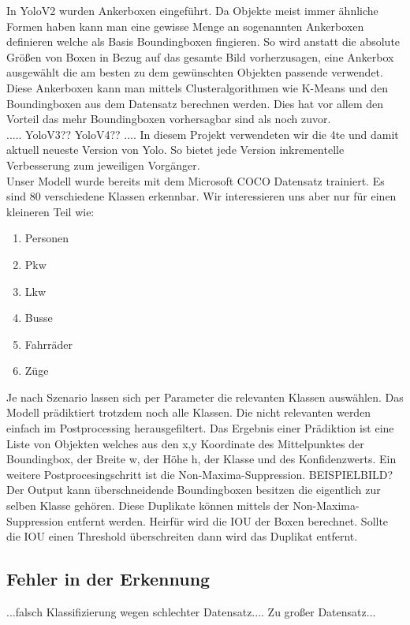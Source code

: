 \documentclass[conference]{IEEEtran}
\begin{document}
	In YoloV2 wurden Ankerboxen eingeführt. Da Objekte meist immer ähnliche Formen haben kann man eine gewisse Menge an sogenannten Ankerboxen definieren welche als Basis Boundingboxen fingieren. So wird anstatt die absolute Größen von Boxen in Bezug auf das gesamte Bild vorherzusagen, eine Ankerbox ausgewählt die am besten zu dem gewünschten Objekten passende verwendet. Diese Ankerboxen kann man mittels Clusteralgorithmen wie K-Means und den Boundingboxen aus dem Datensatz berechnen werden. Dies hat vor allem den Vorteil das mehr Boundingboxen vorhersagbar sind als noch zuvor. \cite{b3}\\
	.....
	YoloV3??
	YoloV4??
	....
	In diesem Projekt verwendeten wir die 4te und damit aktuell neueste Version von Yolo\cite{b2}. So bietet jede Version inkrementelle Verbesserung zum jeweiligen Vorgänger.\\
	Unser Modell wurde bereits mit dem Microsoft COCO Datensatz trainiert. Es sind 80 verschiedene Klassen erkennbar. Wir interessieren uns aber nur für einen kleineren Teil wie:
	\begin{enumerate}
		\item Personen
		\item Pkw
		\item Lkw
		\item Busse
		\item Fahrräder
		\item Züge
	\end{enumerate}
	Je nach Szenario lassen sich per Parameter die relevanten Klassen auswählen. Das Modell prädiktiert trotzdem noch alle Klassen. Die nicht relevanten werden einfach im Postprocessing herausgefiltert. Das Ergebnis einer Prädiktion ist eine Liste von Objekten welches aus den x,y Koordinate des Mittelpunktes der Boundingbox, der Breite w, der Höhe h, der Klasse und des Konfidenzwerts.
	Ein weitere Postprocesingschritt ist die Non-Maxima-Suppression. BEISPIELBILD? Der Output kann überschneidende Boundingboxen besitzen die eigentlich zur selben Klasse gehören. Diese Duplikate können mittels der Non-Maxima-Suppression entfernt werden. Heirfür wird die IOU der Boxen berechnet. Sollte die IOU einen Threshold überschreiten dann wird das Duplikat entfernt.
	
	\subsection{Fehler in der Erkennung}
	...falsch Klassifizierung wegen schlechter Datensatz....
	Zu großer Datensatz...
	
\end{document}
